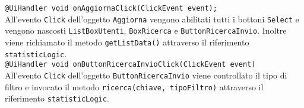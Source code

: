 {\begin{sloppypar}
{{{\begin{itemize}
					\texttt{@UiHandler void onAggiornaClick(ClickEvent event);}\\
					All'evento \texttt{Click} dell'oggetto \texttt{Aggiorna} vengono abilitati tutti i bottoni \texttt{Select} e vengono nascosti \texttt{ListBoxUtenti}, \texttt{BoxRicerca} e \texttt{ButtonRicercaInvio}. Inoltre viene richiamato il metodo \texttt{getListData()} attraverso il riferimento \texttt{statisticLogic}.\\
					
					\texttt{@UiHandler void onButtonRicercaInvioClick(ClickEvent event)}\\
					All'evento \texttt{Click} dell'oggetto \texttt{ButtonRicercaInvio} viene controllato il tipo di filtro e invocato il metodo \texttt{ricerca(chiave, tipoFiltro)} attraverso il riferimento \texttt{statisticLogic}.\\
			\end{itemize}
			}
	}
}
\end{sloppypar}
}

